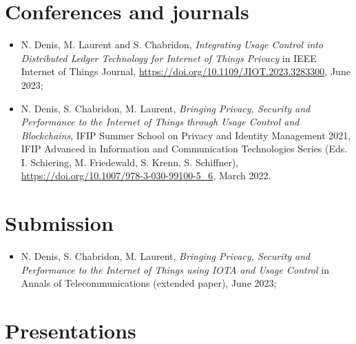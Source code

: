\section*{Conferences and journals}

\begin{itemize}
    \item[] N. Denis, M. Laurent and S. Chabridon, \emph{Integrating Usage Control into Distributed Ledger Technology for Internet of Things Privacy} in IEEE Internet of Things Journal, \url{https://doi.org/10.1109/JIOT.2023.3283300}, June 2023;
    \item[] N. Denis, S. Chabridon, M. Laurent, \emph{Bringing Privacy, Security and Performance to the Internet of Things through Usage Control and Blockchains},  IFIP Summer School on Privacy and Identity Management 2021, IFIP Advanced in Information and Communication Technologies Series (Eds. I. Schiering, M. Friedewald, S. Krenn, S. Schiffner), \url{https://doi.org/10.1007/978-3-030-99100-5_6}, March 2022.
\end{itemize}

\section*{Submission}

\begin{itemize}
    \item N. Denis,  S. Chabridon, M. Laurent, \emph{Bringing Privacy, Security and Performance to the Internet of Things using IOTA and Usage Control} in Annals of Telecommunications (extended paper), June 2023;
\end{itemize}
\section*{Presentations}

